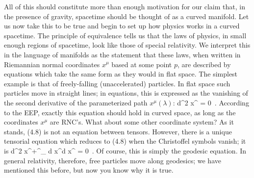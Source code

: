 \documentclass[12pt]{article}
\begin{document}
All of this should constitute more than enough motivation for our
claim that, in the presence of gravity, spacetime should be thought
of as a curved manifold.  Let us now take this to be true and begin
to set up how physics works in a curved spacetime.  The principle
of equivalence tells us that the laws of physics, in small enough
regions of spacetime, look like those of special relativity.  We
interpret this in the language of manifolds as the statement that
these laws, when written in Riemannian normal coordinates $x^\mu$
based at some point $p$, are described by equations which take the
same form as they would in flat space.  The simplest example is
that of freely-falling (unaccelerated) particles.  In flat space
such particles move in straight lines; in equations, this is 
expressed as the vanishing of the second derivative of the parameterized
path $x^\mu(\lambda)$:
\be
  {{d^2 x^\mu}} = 0\ .\label{4.8}
\ee
According to the EEP, exactly this equation should hold in
curved space, as long as the coordinates $x^\mu$ are RNC's.  What
about some other coordinate system?  As it stands, (4.8) is
not an equation between tensors.  However, there is a unique 
tensorial equation which reduces to (4.8) when the Christoffel
symbols vanish; it is
\be
  {{d^2 x^\mu}}+\Gamma^\mu_{\rho\sigma}
  {{d x^\rho}}{{d x^\sigma}} = 0\ .
  \label{4.9}
\ee
Of course, this is simply the geodesic equation.  In general relativity,
therefore, free particles move along geodesics; we have mentioned this
before, but now you know why it is true.
\end{document}
